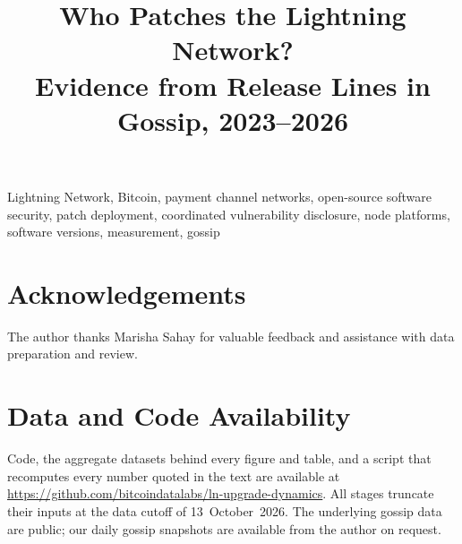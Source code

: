 \documentclass[conference]{IEEEtran}
\begin{document}
\title{Who Patches the Lightning Network?\\
{\LARGE Evidence from Release Lines in Gossip, 2023--2026}}

\author{
}

\maketitle
\thispagestyle{plain}
\pagestyle{plain}

\begin{abstract}

\end{abstract}

\begin{IEEEkeywords}
Lightning Network, Bitcoin, payment channel networks, open-source software security, patch deployment, coordinated
vulnerability disclosure, node platforms, software versions, measurement, gossip
\end{IEEEkeywords}










\section*{Acknowledgements}
The author thanks Marisha Sahay for valuable feedback and assistance with data preparation and review.

\section*{Data and Code Availability}
Code, the aggregate datasets behind every figure and table, and a script that recomputes every number quoted in the
text are available at \url{https://github.com/bitcoindatalabs/ln-upgrade-dynamics}. All stages truncate their inputs
at the data cutoff of 13~October~2026. The underlying gossip data are public; our daily gossip snapshots are
available from the author on request.



\end{document}
